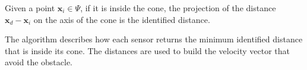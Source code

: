 Given a point ${\mathbf{x}_i \in \Psi}$, if it is inside the cone, the projection of the distance ${\mathbf{x}_d-\mathbf{x}_i}$ on the axis of the cone is the identified distance.

The algorithm describes how each sensor returns the minimum identified distance that is inside its cone. The distances are used to build the velocity vector that avoid the obstacle.

\FloatBarrier